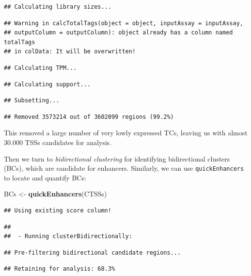 \documentclass[9pt,a4paper,]{extarticle}
\newenvironment{Shaded}{\begin{snugshade}}{\end{snugshade}}
\newcommand{\KeywordTok}[1]{\textcolor[rgb]{0.13,0.29,0.53}{\textbf{{#1}}}}
\newcommand{\StringTok}[1]{\textcolor[rgb]{0.31,0.60,0.02}{{#1}}}
\newcommand{\NormalTok}[1]{{#1}}
\begin{document}
\begin{verbatim}
## Calculating library sizes...
\end{verbatim}

\begin{verbatim}
## Warning in calcTotalTags(object = object, inputAssay = inputAssay,
## outputColumn = outputColumn): object already has a column named totalTags
## in colData: It will be overwritten!
\end{verbatim}

\begin{verbatim}
## Calculating TPM...
\end{verbatim}

\begin{verbatim}
## Calculating support...
\end{verbatim}

\begin{verbatim}
## Subsetting...
\end{verbatim}

\begin{verbatim}
## Removed 3573214 out of 3602099 regions (99.2%)
\end{verbatim}

This removed a large number of very lowly expressed TCs, leaving us with almost 30.000 TSSs candidates for analysis.

Then we turn to \emph{bidirectional clustering} for identifying bidirectional clusters (BCs), which are candidate for enhancers. Similarly, we can use \texttt{quickEnhancers} to locate and quantify BCs:

\begin{Shaded}
\begin{Highlighting}[]
\NormalTok{BCs <-}\StringTok{ }\KeywordTok{quickEnhancers}\NormalTok{(CTSSs)}
\end{Highlighting}
\end{Shaded}

\begin{verbatim}
## Using existing score column!
\end{verbatim}

\begin{verbatim}
## 
##  - Running clusterBidirectionally:
\end{verbatim}

\begin{verbatim}
## Pre-filtering bidirectional candidate regions...
\end{verbatim}

\begin{verbatim}
## Retaining for analysis: 68.3%
\end{verbatim}
\end{document}
